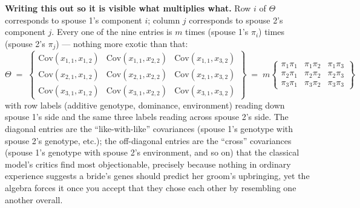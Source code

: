 \documentclass[12pt]{article}
\begin{document}
\textbf{Writing this out so it is visible what multiplies what.} Row $i$ of $\Theta$ corresponds to spouse 1's component $i$; column $j$ corresponds to spouse 2's component $j$. Every one of the nine entries is $m$ times (spouse 1's $\pi_i$) times (spouse 2's $\pi_j$) — nothing more exotic than that:
\begin{equation*}
\Theta \;=\;
\left\{\begin{array}{ccc}
\mathrm{Cov}(x_{1,1},x_{1,2}) & \mathrm{Cov}(x_{1,1},x_{2,2}) & \mathrm{Cov}(x_{1,1},x_{3,2}) \\
\mathrm{Cov}(x_{2,1},x_{1,2}) & \mathrm{Cov}(x_{2,1},x_{2,2}) & \mathrm{Cov}(x_{2,1},x_{3,2}) \\
\mathrm{Cov}(x_{3,1},x_{1,2}) & \mathrm{Cov}(x_{3,1},x_{2,2}) & \mathrm{Cov}(x_{3,1},x_{3,2})
\end{array}\right\}
\;=\;
m\left\{\begin{array}{ccc}
\pi_1\pi_1 & \pi_1\pi_2 & \pi_1\pi_3 \\
\pi_2\pi_1 & \pi_2\pi_2 & \pi_2\pi_3 \\
\pi_3\pi_1 & \pi_3\pi_2 & \pi_3\pi_3
\end{array}\right\}
\end{equation*}
with row labels (additive genotype, dominance, environment) reading down spouse 1's side and the same three labels reading across spouse 2's side. The diagonal entries are the ``like-with-like'' covariances (spouse 1's genotype with spouse 2's genotype, etc.); the off-diagonal entries are the ``cross'' covariances (spouse 1's genotype with spouse 2's environment, and so on) that the classical model's critics find most objectionable, precisely because nothing in ordinary experience suggests a bride's genes should predict her groom's upbringing, yet the algebra forces it once you accept that they chose each other by resembling one another overall.
\end{document}
